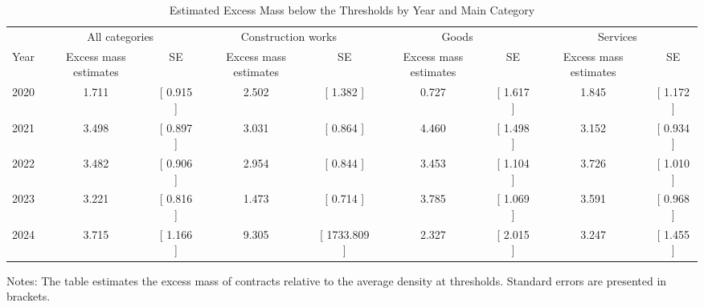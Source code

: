 \begin{table}[htbp]\centering
\caption{Estimated Excess Mass below the Thresholds by Year and Main Category}
\begin{tabular}{l*{8}{c}}
\hline\hline
& \multicolumn{2}{c}{All categories} & \multicolumn{2}{c}{Construction works} & \multicolumn{2}{c}{Goods} & \multicolumn{2}{c}{Services} \\
Year & Excess mass estimates & SE & Excess mass estimates & SE & Excess mass estimates & SE & Excess mass estimates & SE \\
\hline
2020 &  1.711 & [  0.915 ] &  2.502 & [  1.382 ] &  0.727 & [  1.617 ] &  1.845 & [  1.172 ] \\
2021 &  3.498 & [  0.897 ] &  3.031 & [  0.864 ] &  4.460 & [  1.498 ] &  3.152 & [  0.934 ] \\
2022 &  3.482 & [  0.906 ] &  2.954 & [  0.844 ] &  3.453 & [  1.104 ] &  3.726 & [  1.010 ] \\
2023 &  3.221 & [  0.816 ] &  1.473 & [  0.714 ] &  3.785 & [  1.069 ] &  3.591 & [  0.968 ] \\
2024 &  3.715 & [  1.166 ] &  9.305 & [ 1733.809 ] &  2.327 & [  2.015 ] &  3.247 & [  1.455 ] \\
\hline\hline
\end{tabular}
\begin{flushleft}\footnotesize Notes: The table estimates the excess mass of contracts relative to the average density at thresholds. Standard errors are presented in brackets.\end{flushleft}
\end{table}
